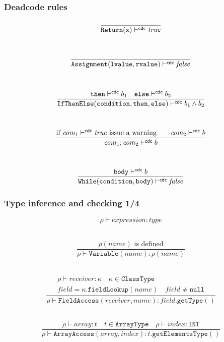 \documentclass[11pt]{beamer}  %
\begin{document}
\begin{frame}\frametitle{Deadcode rules}

\[
  \frac{}{\mathtt{Return(x)}\vdash^{\mathsf{cdc}}\mathit{true}}
\]

\mbox{}\\

\[
  \frac{}{\mathtt{Assignment(lvalue,rvalue)}\vdash^{\mathsf{cdc}}\mathit{false}}
\]

\mbox{}\\

\[
  \frac{\mathtt{then}\vdash^{\mathsf{cdc}} b_1\quad\mathtt{else}\vdash^{\mathsf{cdc}} b_2}
    {\mathtt{IfThenElse(condition,then,else)}\vdash^{\mathsf{cdc}} b_1\wedge b_2}
\]

\mbox{}\\

\[
  \frac{\text{if }\mathit{com}_1\vdash^{\mathsf{cdc}}\mathit{true}\text{ issue a warning}
    \qquad\mathit{com}_2\vdash^{\mathsf{cdc}} b}{\mathit{com}_1;\mathit{com}_2\vdash^{\mathsf{cdc}} b}
\]

\mbox{}\\

\[
  \frac{\mathtt{body}\vdash^{\mathsf{cdc}} b}
    {\mathtt{While(condition,body)}\vdash^{\mathsf{cdc}}\mathit{false}}
\]

\end{frame}

\begin{frame}[fragile]\frametitle{Type inference and checking 1/4}

\[
  \boxed{\rho\vdash expression:type}
\]

\mbox{}\\

\[
  \frac{\rho(\mathit{name})\text{ is defined}}
    {\rho\vdash\mathtt{Variable(\mathit{name})}:\rho(\mathit{name})}
\]

\mbox{}\\

\[
  \frac{\begin{array}{c}
      \rho\vdash\mathit{receiver}:\kappa\quad\kappa\in\mathtt{ClassType}\\
      \mathit{field}=\kappa\mathtt{.fieldLookup(\mathit{name})}\quad
        \mathit{field}\not=\mathtt{null}
       \end{array}}
         {\rho\vdash\mathtt{FieldAccess(\mathit{receiver},\mathit{name})}:
          \mathit{field}\mathtt{.getType()}}
\]

\mbox{}\\

\[
  \frac{\rho\vdash\mathit{array}:t\quad t\in\mathtt{ArrayType}\quad
          \rho\vdash\mathit{index}:\mathtt{INT}}
         {\rho\vdash\mathtt{ArrayAccess(\mathit{array},\mathit{index})}:
          t\mathtt{.getElementsType()}}
\]

\end{frame}
\end{document}
